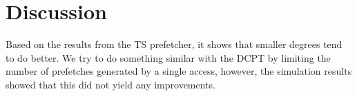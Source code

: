 \section{Discussion}

Based on the results from the TS prefetcher, it shows that smaller degrees tend
to do better. We try to do something similar with the DCPT by limiting the
number of prefetches generated by a single access, however, the simulation
results showed that this did not yield any improvements.
